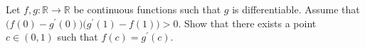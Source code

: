 \documentclass{article}
\begin{document}
\setlength{\parindent}{0pt}
Let \(\displaystyle  f,g: \mathbb{R}\longrightarrow\mathbb{R}\) be continuous functions such that \(\displaystyle g\) is differentiable. Assume that \(\displaystyle  \bigl(f(0)-g^{\prime} (0)\bigr)\bigl(g^{\prime} (1)-f(1)\bigr)>0 \). Show that there exists a point \(\displaystyle c\in(0,1)\) such that \(\displaystyle f(c)=g^\prime (c)\).
\end{document}
